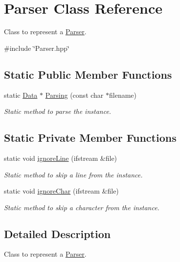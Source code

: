 \hypertarget{classParser}{\section{\-Parser \-Class \-Reference}
\label{classParser}
}


\-Class to represent a {\ttfamily \hyperlink{classParser}{\-Parser}}.  




{\ttfamily \#include \char`\"{}\-Parser.\-hpp\char`\"{}}

\subsection*{\-Static \-Public \-Member \-Functions}
\begin{DoxyCompactItemize}
\item 
static \hyperlink{classData}{\-Data} $\ast$ \hyperlink{classParser_aea9e25451c1ef7c3856ec421c04ecc2d}{\-Parsing} (const char $\ast$filename)
\begin{DoxyCompactList}\small\item\em {\itshape \-Static\/} method to parse the instance. \end{DoxyCompactList}\end{DoxyCompactItemize}
\subsection*{\-Static \-Private \-Member \-Functions}
\begin{DoxyCompactItemize}
\item 
static void \hyperlink{classParser_aaa2bd392ca414d0e8a996505650bda32}{ignore\-Line} (ifstream \&file)
\begin{DoxyCompactList}\small\item\em {\itshape \-Static\/} method to skip a line from the instance. \end{DoxyCompactList}\item 
static void \hyperlink{classParser_a5e25e7111235bee7f660de5886e15b0a}{ignore\-Char} (ifstream \&file)
\begin{DoxyCompactList}\small\item\em {\itshape \-Static\/} method to skip a character from the instance. \end{DoxyCompactList}\end{DoxyCompactItemize}


\subsection{\-Detailed \-Description}
\-Class to represent a {\ttfamily \hyperlink{classParser}{\-Parser}}. 

